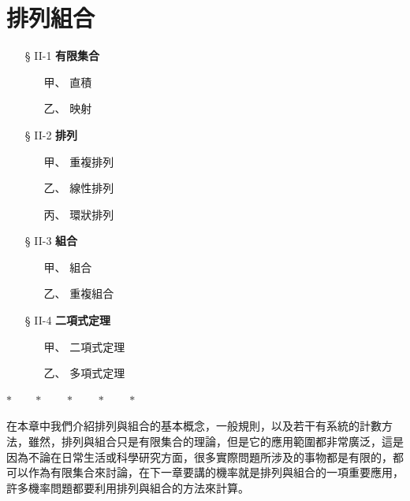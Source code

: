 \section{排列組合}\label{sec:b5-ch2}

\begin{center}
\begin{minipage}{0.75\textwidth}
\begin{itemize}[leftmargin=2em, itemsep=0.3em]
  \item[§ II-1] \textbf{有限集合}
  \begin{itemize}[leftmargin=2em, itemsep=0.2em]
    \item[甲、] 直\quad 積
    \item[乙、] 映\quad 射
  \end{itemize}
  \item[§ II-2] \textbf{排\quad 列}
  \begin{itemize}[leftmargin=2em, itemsep=0.2em]
    \item[甲、] 重複排列
    \item[乙、] 線性排列
    \item[丙、] 環狀排列
  \end{itemize}
  \item[§ II-3] \textbf{組\quad 合}
  \begin{itemize}[leftmargin=2em, itemsep=0.2em]
    \item[甲、] 組\quad 合
    \item[乙、] 重複組合
  \end{itemize}
  \item[§ II-4] \textbf{二項式定理}
  \begin{itemize}[leftmargin=2em, itemsep=0.2em]
    \item[甲、] 二項式定理
    \item[乙、] 多項式定理
  \end{itemize}
\end{itemize}
\end{minipage}
\end{center}

\begin{center}
$* \qquad * \qquad * \qquad * \qquad *$
\end{center}

在本章中我們介紹排列與組合的基本概念，一般規則，以及若干有系統的計數方法，雖然，排列與組合只是有限集合的理論，但是它的應用範圍都非常廣泛，這是因為不論在日常生活或科學研究方面，很多實際問題所涉及的事物都是有限的，都可以作為有限集合來討論，在下一章要講的機率就是排列與組合的一項重要應用，許多機率問題都要利用排列與組合的方法來計算。

